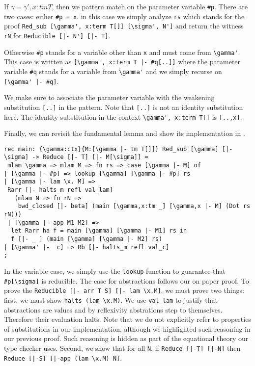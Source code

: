 If $\gamma =\gamma', x:tm T$, then we pattern match on the parameter
variable \lstinline!#p!. There are two cases: either 
\lstinline!#p = x!. in this case we simply analyze \lstinline!rs! which stands for the
proof \lstinline!Red_sub [\gamma', x:term T[]] [\sigma', N']! and return
the witness \lstinline!rN! for 
\lstinline!Reducible [|- N'] [|- T]!. 

Otherwise \lstinline!#p! stands for a variable other than
\lstinline!x! and must come from \lstinline!\gamma'!. This case is
written as \lstinline![\gamma', x:term T |- #q[..]]! where the
parameter variable \lstinline!#q! stands for a variable from
\lstinline!\gamma'! and we simply recurse on 
\lstinline![\gamma' |- #q]!. 

We make sure to associate the parameter variable
with the weakening substitution \lstinline![..]! in the pattern. Note that
\lstinline$[..]$ is not an identity substitution here. The identity
substitution in the context \lstinline!\gamma', x:term T[]! is
\lstinline![..,x]!. 

Finally, we can revisit the fundamental lemma and show its
implementation in \beluga. 

\begin{lstlisting}
rec main: {\gamma:ctx}{M:[\gamma |- tm T[]]} Red_sub [\gamma] [|- \sigma] -> Reduce [|- T] [|- M[\sigma]] =
 mlam \gamma => mlam M => fn rs => case [\gamma |- M] of
| [\gamma |- #p] => lookup [\gamma] [\gamma |- #p] rs
| [\gamma |- lam \x. M] =>
 Rarr [|- halts_m refl val_lam]
   (mlam N => fn rN =>
    bwd_closed [|- beta] (main [\gamma,x:tm _] [\gamma,x |- M] (Dot rs rN)))
 | [\gamma |- app M1 M2] =>
  let Rarr ha f = main [\gamma] [\gamma |- M1] rs in
  f [|- _ ] (main [\gamma] [\gamma |- M2] rs)
| [\gamma' |-  c] => Rb [|- halts_m refl val_c]
;
\end{lstlisting}

In the variable case, we simply use the \lstinline!lookup!-function to
guarantee that \lstinline!#p[\sigma]! is reducible. The case for
abstractions follows our on paper proof. To prove the 
\lstinline!Reducible [|- arr T S] [|- lam \x.M]!, we must prove two
things: first, we must show  \lstinline!halts (lam \x.M)!. We use 
\lstinline!val_lam!  to justify that abstractions are values and by
reflexivity abstrations step to themselves. Therefore their evaluation
halts. Note that we do not explicitly refer to properties of
substitutions in our implementation, although we highlighted such
reasoning in our previous proof. Such reasoning is hidden as part
of the equational theory our type checker uses.
%
Second, we show that
for all \lstinline!N!, if
\lstinline!Reduce [|-T] [|-N]! then 
\lstinline!Reduce [|-S] [|-app (lam \x.M) N]!.  



